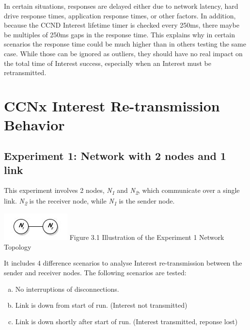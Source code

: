 \documentclass[a4paper,12pt]{report}      %
\begin{document}
In certain situations, responses are delayed either due to network latency, hard drive response times,
application response times, or other factors. In addition, because the CCND Interest lifetime timer is
checked every 250ms, there maybe be multiples of 250ms gaps in the response time. This explains why
in certain scenarios the response time could be much higher than in others testing the same case. While
those can be ignored as outliers, they should have no real impact on the total time of Interest success,
especially when an Interest must be retransmitted.

\section{CCNx Interest Re-transmission Behavior}

\subsection{Experiment 1: Network with 2 nodes and 1 link}

This experiment involves 2 nodes, \emph{N\textsubscript{1}} and \emph{N\textsubscript{2}}, which communicate over a single link. \emph{N\textsubscript{2}} is the receiver node, while \emph{N\textsubscript{1}} is the sender node.

\begin{center}
\includegraphics[scale=0.75]{exp1topo.jpg}\newline
Figure 3.1 Illustration of the Experiment 1 Network Topology\end{center}

\noindent It includes 4 difference scenarios to analyse Interest re-transmission between the sender and receiver
nodes. The following scenarios are tested:

\begin{enumerate}[(a)]
\item No interruptions of disconnections.
\item Link is down from start of run. (Interest not transmitted)
\item Link is down shortly after start of run. (Interest transmitted, reponse lost)
\end{enumerate}
\end{document}
